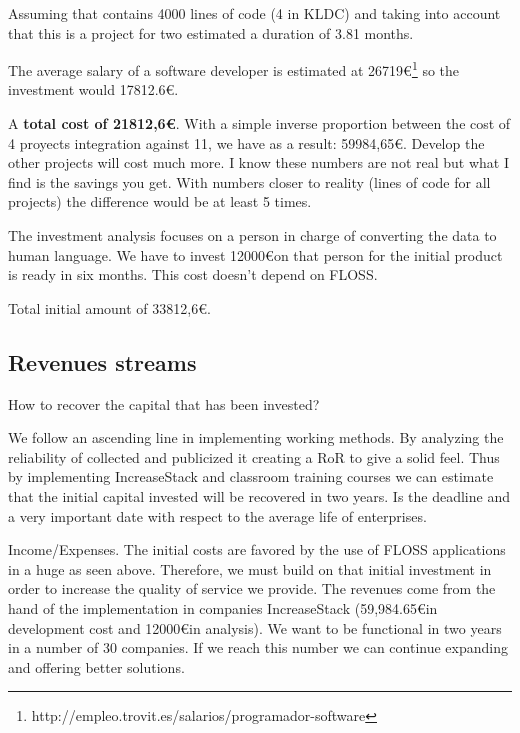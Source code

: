 \documentclass[11pt]{scrartcl}
\begin{document}
\par Assuming that contains 4000 lines of code (4 in KLDC) and taking into account that this is a project for two estimated a duration of 3.81 months.
\par The average salary of a software developer is estimated at 26719\euro\footnote{http://empleo.trovit.es/salarios/programador-software} so the investment would 17812.6\euro.
    
\par A \textbf{total cost of 21812,6\euro}. With a simple inverse proportion between the cost of 4 proyects integration against 11, we have as a result: 59984,65\euro. Develop the other projects will cost much more. I know these numbers are not real but what I find is the savings you get. With numbers closer to reality (lines of code for all projects) the difference would be at least 5 times.

\par The investment analysis focuses on a person in charge of converting the data to human language. We have to invest 12000\euro on that person for the initial product is ready in six months. This cost doesn't depend on FLOSS.

\par Total initial amount of 33812,6\euro.

\subsection{Revenues streams}

\par How to recover the capital that has been invested?

\par We follow an ascending line in implementing working methods. By analyzing the reliability of collected and publicized it creating a RoR to give a solid feel. Thus by implementing IncreaseStack and classroom training courses we can estimate that the initial capital invested will be recovered in two years. Is the deadline and a very important date with respect to the average life of enterprises.

\par Income/Expenses. The initial costs are favored by the use of FLOSS applications in a huge as seen above. Therefore, we must build on that initial investment in order to increase the quality of service we provide. The revenues come from the hand of the implementation in companies IncreaseStack (59,984.65\euro in development cost and 12000\euro in analysis). We want to be functional in two years in a number of 30 companies. If we reach this number we can continue expanding and offering better solutions.
\end{document}
